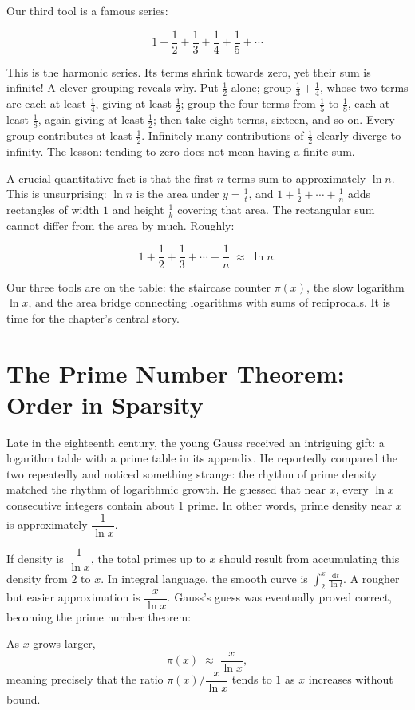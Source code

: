 Our third tool is a famous series:

\[
1+\frac12+\frac13+\frac14+\frac15+\cdots
\]

This is the harmonic series. Its terms shrink towards zero, yet their sum is infinite! A clever grouping reveals why. Put $\frac12$ alone; group $\frac13+\frac14$, whose two terms are each at least $\frac14$, giving at least $\frac12$; group the four terms from $\frac15$ to $\frac18$, each at least $\frac18$, again giving at least $\frac12$; then take eight terms, sixteen, and so on. Every group contributes at least $\frac12$. Infinitely many contributions of $\frac12$ clearly diverge to infinity. The lesson: tending to zero does not mean having a finite sum.

A crucial quantitative fact is that the first $n$ terms sum to approximately $\ln n$. This is unsurprising: $\ln n$ is the area under $y=\frac1t$, and $1+\frac12+\cdots+\frac1n$ adds rectangles of width $1$ and height $\frac1k$ covering that area. The rectangular sum cannot differ from the area by much. Roughly:

\[
1+\frac12+\frac13+\cdots+\frac1n \;\approx\; \ln n.
\]

Our three tools are on the table: the staircase counter $\pi(x)$, the slow logarithm $\ln x$, and the area bridge connecting logarithms with sums of reciprocals. It is time for the chapter's central story.

\section{The Prime Number Theorem: Order in Sparsity}

Late in the eighteenth century, the young Gauss received an intriguing gift: a logarithm table with a prime table in its appendix. He reportedly compared the two repeatedly and noticed something strange: the rhythm of prime density matched the rhythm of logarithmic growth. He guessed that near $x$, every $\ln x$ consecutive integers contain about $1$ prime. In other words, prime density near $x$ is approximately $\dfrac{1}{\ln x}$.

If density is $\dfrac{1}{\ln x}$, the total primes up to $x$ should result from accumulating this density from $2$ to $x$. In integral language, the smooth curve is $\displaystyle\int_2^x \frac{\mathrm{d}t}{\ln t}$. A rougher but easier approximation is $\dfrac{x}{\ln x}$. Gauss's guess was eventually proved correct, becoming the prime number theorem:

\begin{dingli}
As $x$ grows larger,
\[
\pi(x)\;\approx\;\frac{x}{\ln x},
\]
meaning precisely that the ratio $\pi(x)\big/\dfrac{x}{\ln x}$ tends to $1$ as $x$ increases without bound.
\end{dingli}

